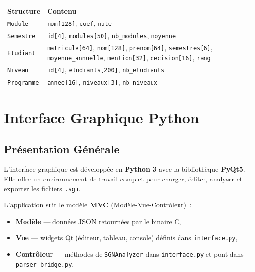 \documentclass[a4paper,12pt]{article}
\begin{document}
\begin{center}
\renewcommand{\arraystretch}{1.2}
\begin{tabular}{ll}
\toprule
\textbf{Structure} & \textbf{Contenu} \\
\midrule
\texttt{Module}    & \texttt{nom[128]}, \texttt{coef}, \texttt{note} \\
\texttt{Semestre}  & \texttt{id[4]}, \texttt{modules[50]}, \texttt{nb\_modules}, \texttt{moyenne} \\
\texttt{Etudiant}  & \texttt{matricule[64]}, \texttt{nom[128]}, \texttt{prenom[64]}, \texttt{semestres[6]},
                     \texttt{moyenne\_annuelle}, \texttt{mention[32]}, \texttt{decision[16]}, \texttt{rang} \\
\texttt{Niveau}    & \texttt{id[4]}, \texttt{etudiants[200]}, \texttt{nb\_etudiants} \\
\texttt{Programme} & \texttt{annee[16]}, \texttt{niveaux[3]}, \texttt{nb\_niveaux} \\
\bottomrule
\end{tabular}
\end{center}

\section{Interface Graphique Python}

\subsection{Présentation Générale}

L'interface graphique est développée en \textbf{Python 3} avec la bibliothèque \textbf{PyQt5}. Elle offre un environnement de travail complet pour charger, éditer, analyser et exporter les fichiers \texttt{.sgn}.

L'application suit le modèle \textbf{MVC} (Modèle-Vue-Contrôleur)~:
\begin{itemize}[leftmargin=1.5em]
  \item \textbf{Modèle} — données JSON retournées par le binaire C,
  \item \textbf{Vue} — widgets Qt (éditeur, tableau, console) définis dans \texttt{interface.py},
  \item \textbf{Contrôleur} — méthodes de \texttt{SGNAnalyzer} dans \texttt{interface.py} et pont dans \texttt{parser\_bridge.py}.
\end{itemize}
\end{document}

